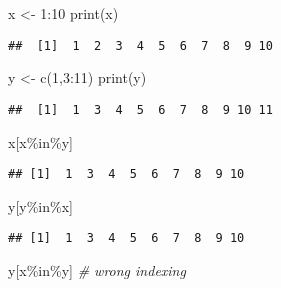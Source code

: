 \documentclass[
]{article}
\newenvironment{Shaded}{\begin{snugshade}}{\end{snugshade}}
\newcommand{\CommentTok}[1]{\textcolor[rgb]{0.56,0.35,0.01}{\textit{#1}}}
\newcommand{\DecValTok}[1]{\textcolor[rgb]{0.00,0.00,0.81}{#1}}
\newcommand{\FunctionTok}[1]{\textcolor[rgb]{0.00,0.00,0.00}{#1}}
\newcommand{\NormalTok}[1]{#1}
\newcommand{\OtherTok}[1]{\textcolor[rgb]{0.56,0.35,0.01}{#1}}
\newcommand{\SpecialCharTok}[1]{\textcolor[rgb]{0.00,0.00,0.00}{#1}}
\begin{document}
\begin{Shaded}
\begin{Highlighting}[]
\NormalTok{x }\OtherTok{\textless{}{-}} \DecValTok{1}\SpecialCharTok{:}\DecValTok{10}
\FunctionTok{print}\NormalTok{(x)}
\end{Highlighting}
\end{Shaded}

\begin{verbatim}
##  [1]  1  2  3  4  5  6  7  8  9 10
\end{verbatim}

\begin{Shaded}
\begin{Highlighting}[]
\NormalTok{y }\OtherTok{\textless{}{-}} \FunctionTok{c}\NormalTok{(}\DecValTok{1}\NormalTok{,}\DecValTok{3}\SpecialCharTok{:}\DecValTok{11}\NormalTok{)}
\FunctionTok{print}\NormalTok{(y)}
\end{Highlighting}
\end{Shaded}

\begin{verbatim}
##  [1]  1  3  4  5  6  7  8  9 10 11
\end{verbatim}

\begin{Shaded}
\begin{Highlighting}[]
\NormalTok{x[x}\SpecialCharTok{\%in\%}\NormalTok{y]}
\end{Highlighting}
\end{Shaded}

\begin{verbatim}
## [1]  1  3  4  5  6  7  8  9 10
\end{verbatim}

\begin{Shaded}
\begin{Highlighting}[]
\NormalTok{y[y}\SpecialCharTok{\%in\%}\NormalTok{x]}
\end{Highlighting}
\end{Shaded}

\begin{verbatim}
## [1]  1  3  4  5  6  7  8  9 10
\end{verbatim}

\begin{Shaded}
\begin{Highlighting}[]
\NormalTok{y[x}\SpecialCharTok{\%in\%}\NormalTok{y] }\CommentTok{\# wrong indexing}
\end{Highlighting}
\end{Shaded}
\end{document}
